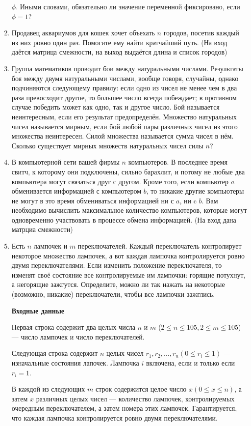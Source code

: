 \documentclass[a4paper, 12pt]{article}
\begin{document}
\begin{enumerate}
        $\phi$. Иными словами, обязательно ли значение переменной фиксировано, если $\phi=1$?
        \item Продавец аквариумов для кошек хочет объехать $n$ городов, посетив каждый из них ровно один раз. Помогите ему найти кратчайший путь. (На вход даётся матрица смежности, на выход выдаётся длина и список городов)
        \item Группа математиков проводит бои между натуральными числами. Результаты боя между двумя натуральными числами, вообще говоря, случайны, однако подчиняются следующему правилу: если одно из чисел не менее чем в два раза превосходит другое, то большее число всегда побеждает; в противном случае победить может как одно, так и другое число.
        Бой называется неинтересным, если его результат предопределён. Множество натуральных чисел называется мирным, если бой любой пары различных чисел из этого множества неинтересен. Силой множества называется сумма чисел в нём. Сколько существует мирных множеств натуральных чисел силы $n$?
        \item В компьютерной сети вашей фирмы $n$ компьютеров. В последнее время свитч, к которому они подключены, сильно барахлит,
        и потому не любые два компьютера могут связаться друг с другом. Кроме того, если компьютер $a$ обменивается информацией с компьютером $b$,
        то никакие другие компьютеры не могут в это время обмениваться информацией ни с $a$, ни c $b$. Вам необходимо вычислить максимальное количество компьютеров,
        которые могут одновременно участвовать в процессе обмена информацией. (На вход дана матрциа смежности)
        \item Есть $n$ лампочек и $m$ переключателей. Каждый переключатель контролирует некоторое множество лампочек, а вот каждая лампочка контролируется ровно
        двумя переключателями. Если изменить положение переключателя, то изменят своё состояние все контролируемые им лампочки: горящие потухнут, а негорящие
        зажгутся. Определите, можно ли так нажать на некоторые (возможно, никакие) переключатели, чтобы все лампочки зажглись.

        \textbf{Входные данные}

        Первая строка содержит два целых числа $n$ и $m$ ($2\leq n\leq105, 2\leq m\leq105$) --- число лампочек и число переключателей.

        Следующая строка содержит $n$ целых чисел $r_1, r_2,\dots,r_n(0\leq r_i\leq 1)$ --- изначальные состояния лапочек. Лампочка $i$ включена, если и только если $r_i=1$.

        В каждой из следующих $m$ строк содержится целое число $x (0\leq x \leq n)$, а затем $x$ различных целых чисел --- количество лампочек, контролируемых очередным переключателем, а затем номера этих лампочек. Гарантируется, что каждая лампочка контролируется ровно двумя переключателями.
    \end{enumerate}
\end{document}
